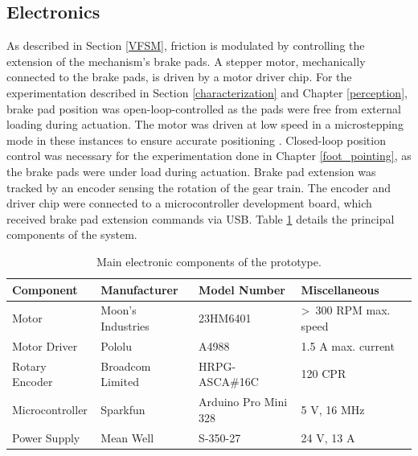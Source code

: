\documentclass [12pt,letterpaper]{report}
\begin{document}
\subsection{Electronics} 

As described in Section \ref{VFSM}, friction is modulated by controlling the extension of the mechanism's brake pads. A stepper motor, mechanically connected to the brake pads, is driven by a motor driver chip. For the experimentation described in Section \ref{characterization} and Chapter \ref{perception}, brake pad position was open-loop-controlled as the pads were free from external loading during actuation. The motor was driven at low speed in a microstepping mode in these instances to ensure accurate positioning \cite{baluta2007microstepping}. Closed-loop position control was necessary for the experimentation done in Chapter \ref{foot_pointing}, as the brake pads were under load during actuation. Brake pad extension was tracked by an encoder sensing the rotation of the gear train. The encoder and driver chip were connected to a microcontroller development board, which received brake pad extension commands via USB. Table \ref{elec_table} details the principal components of the system.


\begin{table}[]
\centering
\caption{Main electronic components of the prototype.}
\label{elec_table}
\begin{tabular}{@{}l|lll@{}}
\toprule
\textbf{Component} & \textbf{Manufacturer} & \textbf{Model Number} & \textbf{Miscellaneous}          \\ \midrule
Motor              & Moon's Industries     & 23HM6401              & \textgreater~300 RPM max. speed \\
Motor Driver       & Pololu                & A4988                 & 1.5 A max. current   \\
Rotary Encoder     & Broadcom Limited      & HRPG-ASCA\#16C        & 120 CPR           \\
Microcontroller    & Sparkfun              & Arduino Pro Mini 328  & 5 V, 16 MHz                     \\
Power Supply       & Mean Well             & S-350-27              & 24 V, 13 A                      \\ \bottomrule
\end{tabular}
\end{table}
\end{document}
